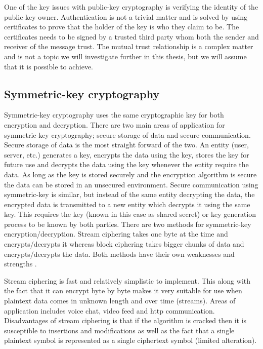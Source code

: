 One of the key issues with public-key cryptography is verifying the identity of the public key owner. Authentication is not a trivial matter and is solved by using certificates to prove that the holder of the key is who they claim to be. The certificates needs to be signed by a trusted third party whom both the sender and receiver of the message trust. The mutual trust relationship is a complex matter and is not a topic we will investigate further in this thesis, but we will assume that it is possible to achieve.

\subsection{Symmetric-key cryptography}
\label{sec:symmetricCrypto}
Symmetric-key cryptography uses the same cryptographic key for both encryption and decryption. There are two main areas of application for symmetric-key cryptography; secure storage of data and secure communication. Secure storage of data is the most straight forward of the two. An entity (user, server, etc.) generates a key, encrypts the data using the key, stores the key for future use and decrypts the data using the key whenever the entity require the data. As long as the key is stored securely and the encryption algorithm is secure the data can be stored in an unsecured environment. Secure communication using symmetric-key is similar, but instead of the same entity decrypting the data, the encrypted data is transmitted to a new entity which decrypts it using the same key. This requires the key (known in this case as shared secret) or key generation process to be known by both parties. There are two methods for symmetric-key encryption/decryption. Stream ciphering takes one byte at the time and encrypts/decrypts it whereas block ciphering takes bigger chunks of data and encrypts/decrypts the data. Both methods have their own weaknesses and strengths \cite[~Ch. 2.1.1]{cryptoMath}.

Stream ciphering is fast and relatively simplistic to implement. This along with the fact that it can encrypt byte by byte makes it very suitable for use when plaintext data comes in  unknown length and over time (streams). Areas of application includes voice chat, video feed and http communication. Disadvantages of stream ciphering is that if the algorithm is cracked then it is susceptible to insertions and modifications as well as the fact that a single plaintext symbol is represented as a single ciphertext symbol (limited alteration).

